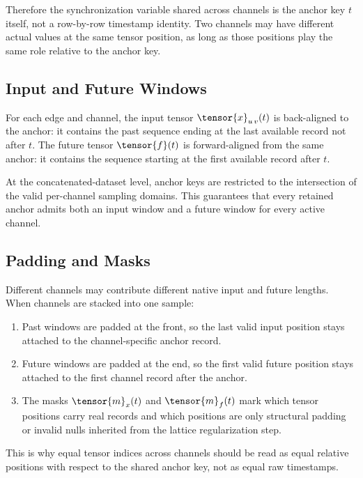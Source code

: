 Therefore the synchronization variable shared across channels is the anchor key
$t$ itself, not a row-by-row timestamp identity.  Two channels may have
different actual  values at the same tensor position, as
long as those positions play the same role relative to the anchor key.

\subsection{Input and Future Windows}
\label{appsub:input-and-future-windows}

For each edge and channel, the input tensor $\tensor{x}_{u\,v}(t)$ is
back-aligned to the anchor:
it contains the past sequence ending at the last available record not after
$t$.  The future tensor $\tensor{f}(t)$ is forward-aligned from the same anchor:
it contains the sequence starting at the first available record after $t$.

At the concatenated-dataset level, anchor keys are restricted to the
intersection of the valid per-channel sampling domains.  This guarantees that
every retained anchor admits both an input window and a future window for every
active channel.

\subsection{Padding and Masks}
\label{appsub:padding-and-masks}

Different channels may contribute different native input and future lengths.
When channels are stacked into one sample:
\begin{enumerate}
\item Past windows are padded at the front, so the last valid input position
stays attached to the channel-specific anchor record.
\item Future windows are padded at the end, so the first valid future position
stays attached to the first channel record after the anchor.
\item The masks $\tensor{m}_x(t)$ and $\tensor{m}_f(t)$ mark which tensor positions
carry real records and which positions are only structural padding or invalid
nulls inherited from the lattice regularization step.
\end{enumerate}

This is why equal tensor indices across channels should be read as equal
relative positions with respect to the shared anchor key, not as equal raw
timestamps.
